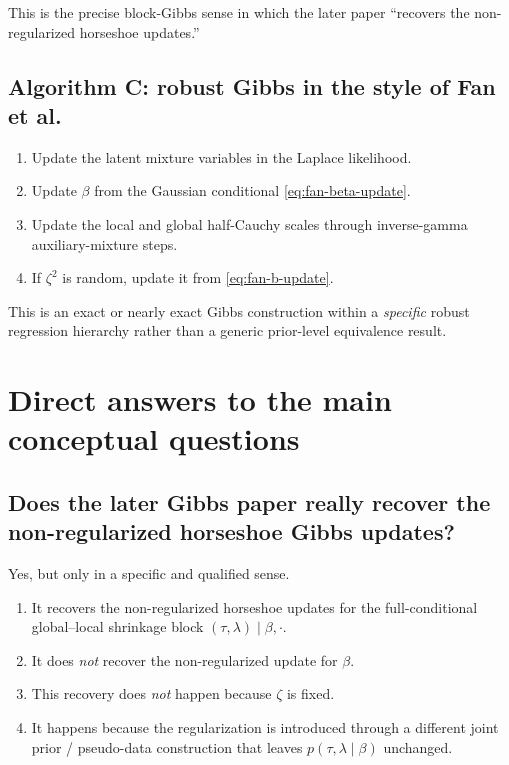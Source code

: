 \documentclass[11pt]{article}
\begin{document}
This is the precise block-Gibbs sense in which the later paper ``recovers the non-regularized horseshoe updates.''

\subsection{Algorithm C: robust Gibbs in the style of Fan et al.}

\begin{enumerate}
\item Update the latent mixture variables in the Laplace likelihood.
\item Update $\beta$ from the Gaussian conditional \eqref{eq:fan-beta-update}.
\item Update the local and global half-Cauchy scales through inverse-gamma auxiliary-mixture steps.
\item If $\zeta^2$ is random, update it from \eqref{eq:fan-b-update}.
\end{enumerate}

This is an exact or nearly exact Gibbs construction within a \emph{specific} robust regression hierarchy rather than a generic prior-level equivalence result.

\section{Direct answers to the main conceptual questions}

\subsection{Does the later Gibbs paper really recover the non-regularized horseshoe Gibbs updates?}

Yes, but only in a specific and qualified sense.

\begin{enumerate}
\item It recovers the non-regularized horseshoe updates for the full-conditional global--local shrinkage block $(\tau,\lambda)\mid\beta,\cdot$.
\item It does \emph{not} recover the non-regularized update for $\beta$.
\item This recovery does \emph{not} happen because $\zeta$ is fixed.
\item It happens because the regularization is introduced through a different joint prior / pseudo-data construction that leaves $p(\tau,\lambda \mid \beta)$ unchanged.
\end{enumerate}
\end{document}
